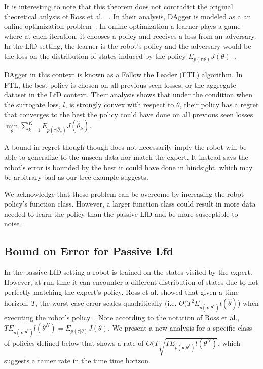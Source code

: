 \documentclass[10pt, conference]{ieeeconf}      %
\newcommand{\bx}{\mathbf{x}}
\begin{document}
It is interesting to note that this theorem does not contradict the original theoretical anlysis of Ross et al. ~\cite{ross2010reduction}. In their analysis, DAgger is modeled as a  an online optimization problem~\cite{ross2010reduction}.  In online optimization a learner plays a game where at each iteration, it chooses a policy and receives a loss from an adversary.  In the LfD setting, the learner is the robot's policy and the adversary would be the loss on the distribution of states induced by the policy $E_{p(\tau|\theta)} J(\theta)$~\cite{shalev2011online}.

DAgger in this context is known as a Follow the Leader (FTL) algorithm. In FTL, the best policy is chosen on all previous seen losses, or the aggregate dataset in the LfD context. Their analysis shows that under the condition when the surrogate loss, $l$, is strongly convex with respect to $\theta$, their policy has a regret that converges to the best the policy could have done on all previous seen losses $\underset{\theta}{\min} \sum_{k=1}^K E_{p(\tau|\hat{\theta}_k)}J(\hat{\theta}_k)$. 

A bound in regret though though does not necessarily imply the robot will be able to generalize to the unseen data nor match the expert. It instead says the robot's error is bounded by the best it could have done in hindsight, which may be arbitrary bad as our tree example suggests. 

We acknowledge that these  problem can be overcome by increasing the robot policy's function class. However, a larger function class could result in more data needed to learn the policy than the passive LfD and be more susceptible to noise~\cite{kakade2009generalization}.

\subsection{Bound on Error for Passive Lfd}
In the passive LfD setting a robot is trained on the states visited by the expert. However, at run time it can encounter a different distribution of states due to not perfectly matching the expert's policy. Ross et al. showed that given a time horizon, $T$, the worst case error scales quadritically (i.e. $O(T^2E_{p(\bx|\theta^*)} l(\hat{\theta})$) when executing the robot's policy~\cite{ross2010efficient}. Note according to the notation of Ross et al., $TE_{p(\bx|\theta^*)} l(\theta^N) = E_{p(\tau|\theta)} J(\theta)$. We present a new analysis for a specific class of policies defined below that shows a rate of $O(T\sqrt{TE_{p(\bx|\theta^*)} l(\theta^N)}$, which suggests a tamer rate in the time time horizon. 
\end{document}
